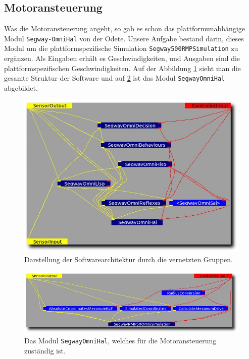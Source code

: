 \subsection{Motoransteuerung}
\label{bahnplanung_motoansteuerung_subsec}
\authorsection{\editoroier}



Was die Motoransteuerung angeht, so gab es schon das plattformunabhängige Modul
\lstinline{Segway-}\lstinline{OmniHal} von der Odete.
Unsere Aufgabe bestand darin, dieses Modul um die plattformspezifische Simulation \lstinline{Segway500RMPSimulation} zu ergänzen.
Als Eingaben erhält es Geschwindigkeiten, und Ausgaben sind die plattformspezifischen Geschwindigkeiten.
Auf der Abbildung \ref{fig:mca2architecture} sieht man die gesamte Struktur der Software und auf \ref{fig:segwayHal} ist das Modul \lstinline{SegwayOmniHal} abgebildet.

\begin{figure}[h]
	\center
	\includegraphics[scale=0.5]{graphics/mca2architecture.png}
	\caption{\label{fig:mca2architecture} Darstellung der Softwarearchitektur durch die vernetzten Gruppen.}
\end{figure}

\begin{figure}[h]
	\center
	\includegraphics[scale=0.5]{graphics/segwayHal.png}
	\caption{\label{fig:segwayHal} Das Modul \lstinline{SegwayOmniHal}, welches für die Motoransteuerung zuständig ist.}
\end{figure}


